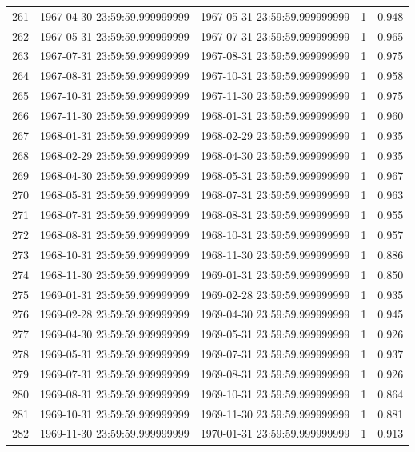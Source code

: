 \begin{table}
\begin{tabular}{lcccc}
261 & 1967-04-30 23:59:59.999999999 & 1967-05-31 23:59:59.999999999 & 1 & 0.948 \\
262 & 1967-05-31 23:59:59.999999999 & 1967-07-31 23:59:59.999999999 & 1 & 0.965 \\
263 & 1967-07-31 23:59:59.999999999 & 1967-08-31 23:59:59.999999999 & 1 & 0.975 \\
264 & 1967-08-31 23:59:59.999999999 & 1967-10-31 23:59:59.999999999 & 1 & 0.958 \\
265 & 1967-10-31 23:59:59.999999999 & 1967-11-30 23:59:59.999999999 & 1 & 0.975 \\
266 & 1967-11-30 23:59:59.999999999 & 1968-01-31 23:59:59.999999999 & 1 & 0.960 \\
267 & 1968-01-31 23:59:59.999999999 & 1968-02-29 23:59:59.999999999 & 1 & 0.935 \\
268 & 1968-02-29 23:59:59.999999999 & 1968-04-30 23:59:59.999999999 & 1 & 0.935 \\
269 & 1968-04-30 23:59:59.999999999 & 1968-05-31 23:59:59.999999999 & 1 & 0.967 \\
270 & 1968-05-31 23:59:59.999999999 & 1968-07-31 23:59:59.999999999 & 1 & 0.963 \\
271 & 1968-07-31 23:59:59.999999999 & 1968-08-31 23:59:59.999999999 & 1 & 0.955 \\
272 & 1968-08-31 23:59:59.999999999 & 1968-10-31 23:59:59.999999999 & 1 & 0.957 \\
273 & 1968-10-31 23:59:59.999999999 & 1968-11-30 23:59:59.999999999 & 1 & 0.886 \\
274 & 1968-11-30 23:59:59.999999999 & 1969-01-31 23:59:59.999999999 & 1 & 0.850 \\
275 & 1969-01-31 23:59:59.999999999 & 1969-02-28 23:59:59.999999999 & 1 & 0.935 \\
276 & 1969-02-28 23:59:59.999999999 & 1969-04-30 23:59:59.999999999 & 1 & 0.945 \\
277 & 1969-04-30 23:59:59.999999999 & 1969-05-31 23:59:59.999999999 & 1 & 0.926 \\
278 & 1969-05-31 23:59:59.999999999 & 1969-07-31 23:59:59.999999999 & 1 & 0.937 \\
279 & 1969-07-31 23:59:59.999999999 & 1969-08-31 23:59:59.999999999 & 1 & 0.926 \\
280 & 1969-08-31 23:59:59.999999999 & 1969-10-31 23:59:59.999999999 & 1 & 0.864 \\
281 & 1969-10-31 23:59:59.999999999 & 1969-11-30 23:59:59.999999999 & 1 & 0.881 \\
282 & 1969-11-30 23:59:59.999999999 & 1970-01-31 23:59:59.999999999 & 1 & 0.913 \\

\end{tabular}
\end{table}
